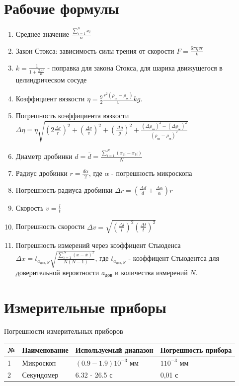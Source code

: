 \documentclass[a4paper]{article}
\begin{document}
\section{Рабочие формулы}
\begin{enumerate}
    \item Среднее значение  $\frac{\sum_{i=1}^n x_i}{n} $
    \item Закон Стокса: зависимость силы трения от скорости $F = \frac{6\pi \eta v r}{k}$
    \item $k = \frac{1}{1 + \frac{2.4 r}{R}}$ - поправка для закона Стокса, для шарика движущегося в целиндрическом сосуде
    \item Коэффициент вязкости $\eta = \frac{9}{2}\frac{r^2(\rho_ш - \rho_ж)}{v} k g$.
    \item Погрешность коэффициента вязкости $\Delta \eta =  \eta \sqrt{(2\frac{\Delta r}{r})^2 + (\frac{\Delta v}{v})^2 + (\frac{\Delta g}{g})^2 + \frac{(\Delta \rho_ш)^2 - (\Delta \rho_ж)^2}{(\rho_ш - \rho_ж)^2}}$
    \item Диаметр дробинки $d = \overline{d} = \frac{\sum_{i=1}^N (x_{2i} - x_{1i})}{N}$
    \item Радиус дробинки $r = \frac{d \alpha}{2}$, где $\alpha$ - погрешность микроскопа
    \item Погрешность радиуса дробинки $\Delta r = (\frac{\Delta d}{d} + \frac{\Delta \alpha}{\alpha})r$
    \item Скорость $v = \frac{l}{t}$
    \item Погрешность скорости $\Delta v =  \sqrt{(\frac{\Delta l}{l})^2 (\frac{\Delta t}{t})^2}$
    \item Погрешность измерений через коэффицент Стьюденса $\Delta x = t_{a_{дов, N}}\sqrt{\frac{\sum\limits_{i=1}^N (x - \bar{x})^2}{N (N-1)}}$, где $t_{a_{дов, N}}$ - коэффицент Стьюдентса для доверительной вероятности $a_{дов}$ и количества измерений $N$.
\end{enumerate}
\section{Измерительные приборы}
$\textbf{Погрешности измерительных приборов}$

\begin{tabular}{ l | l | l | l }\hline
№ & Наименование & Используемый диапазон & Погрешность прибора \\ \hline
1 & Микроскоп  &  $(0.9 - 1.9 ) 10^{-3}$ мм  & $ 1 10^{-3} $ мм \\  \hline
2 &	Секундомер & 6.32 - 26.5 с & 	0,01 с \\   \hline
\end{tabular}
\end{document}
